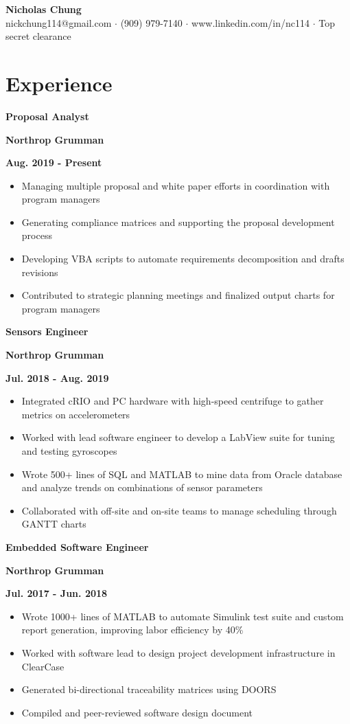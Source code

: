 \documentclass[12pt]{article}
\newcommand\textbox[1]{\parbox{.333\textwidth}{#1}}
\newcommand{\textlcr}[3]{\textbox{\textbf{#1}\hfill}\textbox{\hfil \textbf{#2}\hfil}\textbox{\hfill \textbf{#3}}}
\begin{document}
\begin{center}
	\textbf{\LARGE Nicholas Chung} \\ \vspace{.5ex}
	nickchung114@gmail.com $\cdot$ (909) 979-7140 $\cdot$ www.linkedin.com/in/nc114 $\cdot$ Top secret clearance
\end{center}

\vspace{-8pt}
\smallskip

\section*{Experience}
\vspace*{-1em}\makebox[\linewidth]{\rule{\textwidth}{0.4pt}}

\textlcr{Proposal Analyst}{Northrop Grumman}{Aug. 2019 - Present}
\begin{itemize}
\item Managing multiple proposal and white paper efforts in coordination with program managers
\item Generating compliance matrices and supporting the proposal development process
\item Developing VBA scripts to automate requirements decomposition and drafts revisions
\item Contributed to strategic planning meetings and finalized output charts for program managers

\end{itemize}

\textlcr{Sensors Engineer}{Northrop Grumman}{Jul. 2018 - Aug. 2019}
\begin{itemize}
\item Integrated cRIO and PC hardware with high-speed centrifuge to gather metrics on accelerometers
\item Worked with lead software engineer to develop a LabView suite for tuning and testing gyroscopes
\item Wrote 500+ lines of SQL and MATLAB to mine data from Oracle database and analyze trends on combinations of sensor parameters
\item Collaborated with off-site and on-site teams to manage scheduling through GANTT charts
\end{itemize}

\bigskip
\textlcr{Embedded Software Engineer}{Northrop Grumman}{Jul. 2017 - Jun. 2018}
\begin{itemize}
\item Wrote 1000+ lines of MATLAB to automate Simulink test suite and custom report generation, improving labor efficiency by 40\%
\item Worked with software lead to design project development infrastructure in ClearCase
\item Generated bi-directional traceability matrices using DOORS
\item Compiled and peer-reviewed software design document
\end{itemize}
\end{document}
